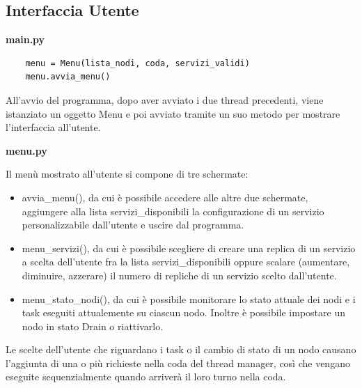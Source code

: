 \documentclass[12pt,a4paper]{article}
\begin{document}
\subsection{Interfaccia Utente}
\begin{center}
\textbf{main.py}
\end{center}
\begin{verbatim}
    menu = Menu(lista_nodi, coda, servizi_validi)
    menu.avvia_menu()
\end{verbatim}
All'avvio del programma, dopo aver avviato i due thread precedenti, viene istanziato un oggetto Menu e poi avviato tramite un suo metodo per mostrare l'interfaccia all'utente.
\begin{center}
\textbf{menu.py}
\end{center}
Il menù mostrato all'utente si compone di tre schermate:
\begin{itemize}
    \item avvia\_menu(), da cui è possibile accedere alle altre due schermate, aggiungere alla lista servizi\_disponibili la configurazione di un servizio personalizzabile dall'utente e uscire dal programma.
    \item menu\_servizi(), da cui è possibile scegliere di creare una replica di un servizio a scelta dell'utente fra la lista servizi\_disponibili oppure scalare (aumentare, diminuire, azzerare) il numero di repliche di un servizio scelto dall'utente.
    \item menu\_stato\_nodi(), da cui è possibile monitorare lo stato attuale dei nodi e i task eseguiti attualemente su ciascun nodo. Inoltre è possibile impostare un nodo in stato Drain o riattivarlo.
\end{itemize}
Le scelte dell'utente che riguardano i task o il cambio di stato di un nodo causano l'aggiunta di una o più richieste nella coda del thread manager, così che vengano eseguite sequenzialmente quando arriverà il loro turno nella coda.
\end{document}
